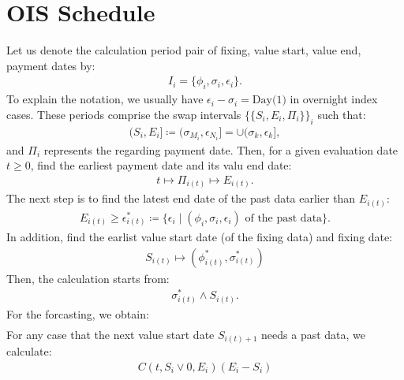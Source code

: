 \documentclass[a4paper, 11pt]{article}              %
\numberwithin{equation}{section}
\theoremstyle{plain}
\newcommand{\1}{\mathds{1}}
\theoremstyle{plain}
\theoremstyle{definition}
\theoremstyle{plain}
\begin{document}
\section{OIS Schedule}
\label{sec:ois}
Let us denote the calculation period pair of fixing, value start,
value end, payment dates by:
\begin{align}
  I_i = \{\phi_i, \sigma_i, \epsilon_i\}.
\end{align}
To explain the notation, we usually have $\epsilon_i - \sigma_i = \text{Day(1)}$
in overnight index cases. These periods comprise the swap intervals
$\{\{S_i, E_i, \Pi_i\}\}_i$ such that:
\begin{align}
  (S_i, E_i] \coloneqq (\sigma_{M_i}, \epsilon_{N_i}] = \cup(\sigma_k, \epsilon_k],
\end{align}
and $\Pi_i$ represents the regarding payment date. 
Then, for a given evaluation date $t \geq 0$, find the earliest payment date and
its valu end date:
\begin{align}
  t \mapsto \Pi_{i(t)} \mapsto E_{i(t)}.
\end{align}
The next step is to find the latest end date of the past data earlier than
$E_{i(t)}$:
\begin{align}
  E_{i(t)} \geq \epsilon^*_{i(t)}
  \coloneqq \{\epsilon_i \mid (\phi_i, \sigma_i, \epsilon_i) \text{ of the past data}\}.
\end{align}
In addition, find the earlist value start date (of the fixing data) and fixing
date:
\begin{align}
  S_{i(t)} \mapsto (\phi^*_{i(t)}, \sigma_{i(t)}^*)
\end{align}
Then, the calculation starts from:
\begin{align}
  \sigma_{i(t)}^* \wedge S_{i(t)}.
\end{align}
For the forcasting, we obtain:
\begin{align}
  [1+C(0, 0, E_{i(t)}) (E_{i(t)} -\epsilon^*_{i(t)})]
\end{align}
For any case that the next value start date $S_{i(t)+1}$ needs a past data, we
calculate:
\begin{align}
  C(t, S_i \vee 0, E_i) (E_{i} -S_{i})
\end{align}
\end{document}
